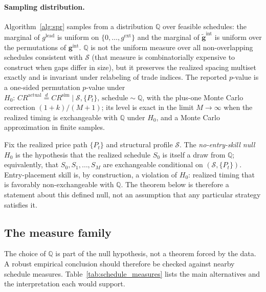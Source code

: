 \documentclass[risks,article,submit,pdftex,oneauthor]{Definitions/mdpi}
\begin{document}
\paragraph{Sampling distribution.} Algorithm~\ref{alg:spr} samples from a distribution $\mathbb{Q}$ over feasible schedules: the marginal of $g^{\mathrm{lead}}$ is uniform on $\{0,\ldots,g^{\mathrm{ext}}\}$ and the marginal of $\tilde{\mathbf{g}}^{\mathrm{int}}$ is uniform over the permutations of $\mathbf{g}^{\mathrm{int}}$. $\mathbb{Q}$ is not the uniform measure over all non-overlapping schedules consistent with $\mathcal{S}$ (that measure is combinatorially expensive to construct when gaps differ in size), but it preserves the realized spacing multiset exactly and is invariant under relabeling of trade indices. The reported $p$-value is a one-sided permutation $p$-value under $H_0:\,CR^{\mathrm{actual}}\stackrel{d}{=}CR^{\mathrm{sim}}\mid \mathcal{S}, \{P_t\},\,\text{schedule}\sim\mathbb{Q}$, with the plus-one Monte Carlo correction $(1+k)/(M+1)$; its level is exact in the limit $M\to\infty$ when the realized timing is exchangeable with $\mathbb{Q}$ under $H_0$, and a Monte Carlo approximation in finite samples.

\begin{Definition}
\label{def:h0}
Fix the realized price path $\{P_t\}$ and structural profile $\mathcal{S}$. The \emph{no-entry-skill null} $H_0$ is the hypothesis that the realized schedule $S_0$ is itself a draw from $\mathbb{Q}$; equivalently, that $S_0,S_1,\ldots,S_M$ are exchangeable conditional on $(\mathcal{S},\{P_t\})$. Entry-placement skill is, by construction, a violation of $H_0$: realized timing that is favorably non-exchangeable with $\mathbb{Q}$. The theorem below is therefore a statement about this defined null, not an assumption that any particular strategy satisfies it.
\end{Definition}

\subsection{The measure family}

The choice of $\mathbb{Q}$ is part of the null hypothesis, not a theorem forced by the data. A robust empirical conclusion should therefore be checked against nearby schedule measures. Table~\ref{tab:schedule_measures} lists the main alternatives and the interpretation each would support.
\end{document}
